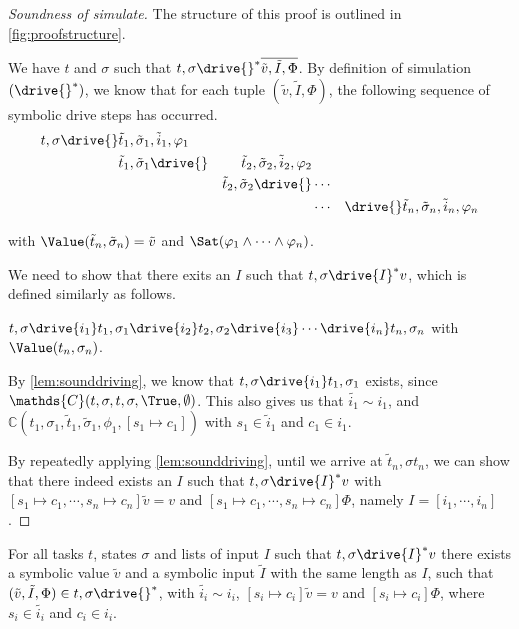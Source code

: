 \begin{proof}[Soundness of simulate]
  The structure of this proof is outlined in \cref{fig:proofstructure}.

  We have $t$ and $\sigma$ such that $t,\sigma\drive{}^*\overline{\tilde{v},\tilde{I},\Phi}$.
  By definition of simulation $(\drive{}^*)$, we know that for each tuple $(\tilde{v},\tilde{I},\Phi)$,
  the following sequence of symbolic drive steps has occurred.
  \begin{align*}
      t,\sigma\drive{}&\tilde{t}_1,\tilde{\sigma}_1,\tilde{i}_1,\phi_1&\\
                      &\tilde{t}_1,\tilde{\sigma}_1\drive{}&\tilde{t}_2,\tilde{\sigma}_2,\tilde{i}_2,\phi_2\\
                      &                                    &\tilde{t}_2,\tilde{\sigma}_2\drive{}&\cdots&\\
                      &                                    &                                    &\cdots&
                      \drive{}\tilde{t}_n,\tilde{\sigma}_n,\tilde{i}_n,\phi_n
  \end{align*}

  with $\Value(\tilde{t}_n,\tilde{\sigma}_n)=\tilde{v}$ and $\Sat(\phi_1\land\cdots\land\phi_n)$.

  We need to show that there exits an $I$ such that $t,\sigma\drive{I}^*v$, which is defined similarly as follows.

  $t,\sigma\drive{i_1}t_1,\sigma_1\drive{i_2}t_2,\sigma_2\drive{i_3}\cdots \drive{i_n}t_n,\sigma_n$ with $\Value(t_n,\sigma_n)$.

  By \cref{lem:sounddriving}, we know that $t,\sigma\drive{i_1}t_1,\sigma_1$ exists, since $\mathds{C}(t,\sigma,t,\sigma,\True,\emptyset)$.
  This also gives us that $\tilde{i_1}\sim i_1$, and $\mathds{C}(t_1,\sigma_1,\tilde{t}_1,\tilde{\sigma}_1,\phi_1,[s_1\mapsto c_1])$ with $s_1\in\tilde{i}_1$ and $c_1\in i_1$.

  By repeatedly applying \cref{lem:sounddriving}, until we arrive at $\tilde{t}_n,\sigma{t}_n$,
  we can show that there indeed exists an $I$ such that $t,\sigma\drive{I}^*v$ with $[s_1\mapsto c_1,\cdots,s_n\mapsto c_n]\tilde{v}=v$
  and $[s_1\mapsto c_1,\cdots,s_n\mapsto c_n]\Phi$, namely $I=[i_1,\cdots,i_n]$.

\end{proof}

\begin{lemma}
  \label{lem:completesimulate}
  For all tasks $t$, states $\sigma$ and lists of input $I$
  such that $t,\sigma\drive{I}^*v$
  there exists a symbolic value $\tilde{v}$ and a symbolic input $\tilde{I}$ with the same length as $I$,
  such that $(\tilde{v},\tilde{I},\Phi)\in t,\sigma\drive{}^*$,
  with $\tilde{i_i}\sim i_i$, $[s_i\mapsto c_i]\tilde{v}=v$ and $[s_i\mapsto c_i]\Phi$,
  where $s_i\in\tilde{i_i}$ and $c_i\in i_i$.
\end{lemma}

